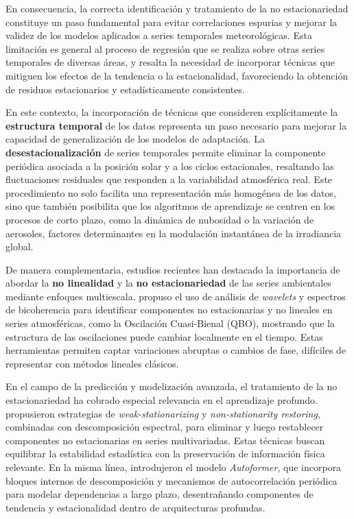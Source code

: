 \documentclass[letterpaper,12pt, twoside]{report}
\providecommand{\DIFdeltex}[1]{{\protect\color{red} \scriptsize #1}} %
\providecommand{\DIFdel}[1]{\texorpdfstring{\DIFdeltex{#1}}{}} %
\begin{document}
\DIFdel{En consecuencia, la correcta identificación y tratamiento de la no estacionariedad constituye un paso fundamental para evitar correlaciones espurias y mejorar la validez de los modelos aplicados a series temporales meteorológicas. Esta limitación es general al proceso de regresión que se realiza sobre otras series temporales de diversas áreas, y resalta la necesidad de incorporar técnicas que mitiguen los efectos de la tendencia o la estacionalidad, favoreciendo la obtención de residuos estacionarios y estadísticamente consistentes.
}%

\DIFdel{En este contexto, la incorporación de técnicas que consideren explícitamente la \textbf{estructura temporal} de los datos representa un paso necesario para mejorar la capacidad de generalización de los modelos de adaptación. La \textbf{desestacionalización} de series temporales permite eliminar la componente periódica asociada a la posición solar y a los ciclos estacionales, resaltando las fluctuaciones residuales que responden a la variabilidad atmosférica real. Este procedimiento no solo facilita una representación más homogénea de los datos, sino que también posibilita que los algoritmos de aprendizaje se centren en los procesos de corto plazo, como la dinámica de nubosidad o la variación de aerosoles, factores determinantes en la modulación instantánea de la irradiancia global.
}%

\DIFdel{De manera complementaria, estudios recientes han destacado la importancia de abordar la \textbf{no linealidad} y la \textbf{no estacionariedad} de las series ambientales mediante enfoques multiescala. \citep{Schulte2016} propuso el uso de análisis de \emph{wavelets} y espectros de bicoherencia para identificar componentes no estacionarias y no lineales en series atmosféricas, como la Oscilación Cuasi-Bienal (QBO), mostrando que la estructura de las oscilaciones puede cambiar localmente en el tiempo. Estas herramientas permiten captar variaciones abruptas o cambios de fase, difíciles de representar con métodos lineales clásicos.
}%

\DIFdel{En el campo de la predicción y modelización avanzada, el tratamiento de la no estacionariedad ha cobrado especial relevancia en el aprendizaje profundo. \citep{Baidya2024} propusieron estrategias de \emph{weak-stationarizing} y \emph{non-stationarity restoring}, combinadas con descomposición espectral, para eliminar y luego restablecer componentes no estacionarias en series multivariadas. Estas técnicas buscan equilibrar la estabilidad estadística con la preservación de información física relevante. En la misma línea, \cite{Wu2021} introdujeron el modelo \emph{Autoformer}, que incorpora bloques internos de descomposición y mecanismos de autocorrelación periódica para modelar dependencias a largo plazo, desentrañando componentes de tendencia y estacionalidad dentro de arquitecturas profundas.
}%
\end{document}
